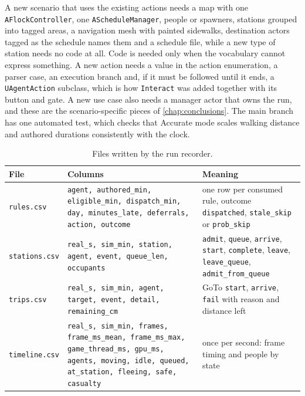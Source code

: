 A new scenario that uses the existing actions needs a map with one \texttt{AFlockController}, one \texttt{AScheduleManager}, people or spawners, stations grouped into tagged areas, a navigation mesh with painted sidewalks, destination actors tagged as the schedule names them and a schedule file, while a new type of station needs no code at all. Code is needed only when the vocabulary cannot express something. A new action needs a value in the action enumeration, a parser case, an execution branch and, if it must be followed until it ends, a \texttt{UAgentAction} subclass, which is how \texttt{Interact} was added together with its button and gate. A new use case also needs a manager actor that owns the run, and these are the scenario-specific pieces of \cref{chap:conclusions}. The main branch has one automated test, which checks that Accurate mode scales walking distance and authored durations consistently with the clock.

\begin{table}[H]
\centering
{\compacttable
\begin{tabularx}{\textwidth}{|l|R{7.0cm}|Q|}
\hline
{}\textbf{File} & \textbf{Columns} & \textbf{Meaning} \\
\hline
\texttt{rules.csv} & \texttt{agent, authored\_min, eligible\_min, dispatch\_min, day, minutes\_late, deferrals, action, outcome} & one row per consumed rule, outcome \texttt{dispatched}, \texttt{stale\_skip} or \texttt{prob\_skip} \\ \hline
\texttt{stations.csv} & \texttt{real\_s, sim\_min, station, agent, event, queue\_len, occupants} & \texttt{admit}, \texttt{queue}, \texttt{arrive}, \texttt{start}, \texttt{complete}, \texttt{leave}, \texttt{leave\_queue}, \texttt{admit\_from\_queue} \\ \hline
\texttt{trips.csv} & \texttt{real\_s, sim\_min, agent, target, event, detail, remaining\_cm} & GoTo \texttt{start}, \texttt{arrive}, \texttt{fail} with reason and distance left \\ \hline
\texttt{timeline.csv} & \texttt{real\_s, sim\_min, frames, frame\_ms\_mean, frame\_ms\_max, game\_thread\_ms, gpu\_ms, agents, moving, idle, queued, at\_station, fleeing, safe, casualty} & once per second: frame timing and people by state \\ \hline
\end{tabularx}}
\caption[Run recorder files]{Files written by the run recorder.}
\label{tab:recorder-files}
\end{table}

